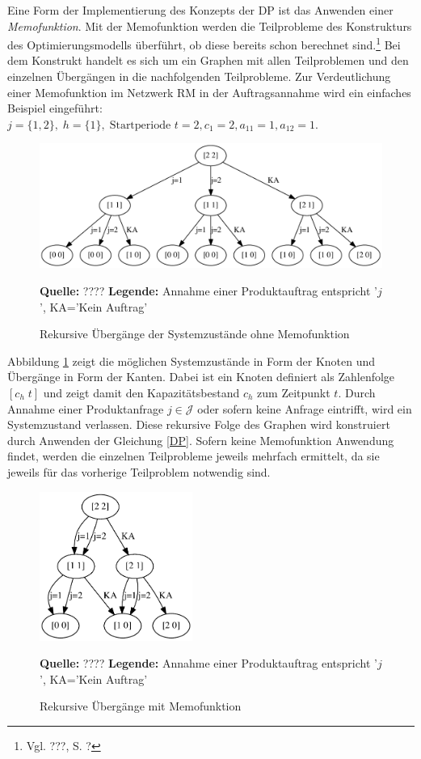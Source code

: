 Eine Form der Implementierung des Konzepts der DP ist das Anwenden einer \textit{Memofunktion}. Mit der Memofunktion werden die Teilprobleme des Konstrukturs des Optimierungsmodells überführt, ob diese bereits schon berechnet sind.\footnote{Vgl. ???, S. ?} Bei dem Konstrukt handelt es sich um ein Graphen mit allen Teilproblemen und den einzelnen Übergängen in die nachfolgenden Teilprobleme. Zur Verdeutlichung einer Memofunktion im Netzwerk RM in der Auftragsannahme wird ein einfaches Beispiel eingeführt: $j = \{1, 2\}, \; h = \{1\}, \; \text{Startperiode } t=2, c_{1}=2, a_{11}=1, a_{12}=1.$

\begin{figure}[h!]
  \begin{center}
    \includegraphics[width=140mm]{Bilder/Einfach.pdf}
    \caption{Rekursive Übergänge der Systemzustände ohne Memofunktion}  \label{Einfach}
        {\footnotesize \textbf{Quelle:} ????} 
    {\footnotesize \textbf{Legende:} Annahme einer Produktauftrag entspricht '$j$', KA='Kein Auftrag'} 
  \end{center}
\end{figure}

Abbildung \ref{Einfach} zeigt die möglichen Systemzustände in Form der Knoten und Übergänge in Form der Kanten. Dabei ist ein Knoten definiert als Zahlenfolge $[c_h\; t]$ und zeigt damit den Kapazitätsbestand $c_h$ zum Zeitpunkt $t$. Durch Annahme einer Produktanfrage $j\in\mathcal{J}$ oder sofern keine Anfrage eintrifft, wird ein Systemzustand verlassen. Diese rekursive Folge des Graphen wird konstruiert durch Anwenden der Gleichung \eqref{DP}. Sofern keine Memofunktion Anwendung findet, werden die einzelnen Teilprobleme jeweils mehrfach ermittelt, da sie jeweils für das vorherige Teilproblem notwendig sind.

\begin{figure}[h!]
  \begin{center}
    \includegraphics[width=50mm]{Bilder/Einfach2.pdf}
    \caption{Rekursive Übergänge mit Memofunktion}  \label{Einfach2}
        {\footnotesize \textbf{Quelle:} ????} 
    {\footnotesize \textbf{Legende:} Annahme einer Produktauftrag entspricht '$j$', KA='Kein Auftrag'} 
  \end{center}
\end{figure}

